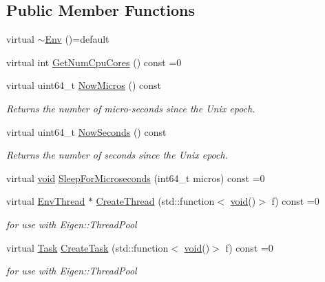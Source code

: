 \subsection*{Public Member Functions}
\begin{DoxyCompactItemize}
\item 
virtual \mbox{\hyperlink{classonnxruntime_1_1Env_abe66ea0aa527876cb0dadd0a5eeef6d1}{$\sim$\+Env}} ()=default
\item 
virtual int \mbox{\hyperlink{classonnxruntime_1_1Env_af71e66e4843c33e287984e0d942274a5}{Get\+Num\+Cpu\+Cores}} () const =0
\item 
virtual uint64\+\_\+t \mbox{\hyperlink{classonnxruntime_1_1Env_a001849df94fd8eb65a81a70307197061}{Now\+Micros}} () const
\begin{DoxyCompactList}\small\item\em Returns the number of micro-\/seconds since the Unix epoch. \end{DoxyCompactList}\item 
virtual uint64\+\_\+t \mbox{\hyperlink{classonnxruntime_1_1Env_a1de6adfcff338e90b34a65803718afdf}{Now\+Seconds}} () const
\begin{DoxyCompactList}\small\item\em Returns the number of seconds since the Unix epoch. \end{DoxyCompactList}\item 
virtual \mbox{\hyperlink{mlasi_8h_a88f941d423cb2a819b70a1358982b1a6}{void}} \mbox{\hyperlink{classonnxruntime_1_1Env_a2652f151c55c07c900f1e47993e603b8}{Sleep\+For\+Microseconds}} (int64\+\_\+t micros) const =0
\item 
virtual \mbox{\hyperlink{classonnxruntime_1_1Env_a6bb161baf73e98f7fd274db84e3fb489}{Env\+Thread}} $\ast$ \mbox{\hyperlink{classonnxruntime_1_1Env_aced00fdfcbf0f82b59c3bad35bbdfb57}{Create\+Thread}} (std\+::function$<$ \mbox{\hyperlink{mlasi_8h_a88f941d423cb2a819b70a1358982b1a6}{void}}()$>$ f) const =0
\begin{DoxyCompactList}\small\item\em for use with Eigen\+::\+Thread\+Pool \end{DoxyCompactList}\item 
virtual \mbox{\hyperlink{structonnxruntime_1_1Env_1_1Task}{Task}} \mbox{\hyperlink{classonnxruntime_1_1Env_a1cb46f1c66f9ea35bcae259a38cfb84b}{Create\+Task}} (std\+::function$<$ \mbox{\hyperlink{mlasi_8h_a88f941d423cb2a819b70a1358982b1a6}{void}}()$>$ f) const =0
\begin{DoxyCompactList}\small\item\em for use with Eigen\+::\+Thread\+Pool \end{DoxyCompactList}\item 

\end{DoxyCompactItemize}
